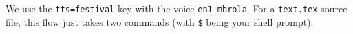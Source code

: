 We use the \texttt{tts=festival} key with the voice \texttt{en1\_mbrola}.  For a \texttt{text.tex} source file, this flow just takes two
  commands (with \texttt{\$} being your shell prompt):
